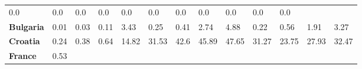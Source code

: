 \begin{table}[H]
{\begin{tabular}{lllllllllllll}
            0.0                                                &
            0.0                                                &
            0.0                                                &
            0.0                                                &
            0.0                                                &
            0.0                                                &
            0.0                                                &
            0.0                                                &
            0.0                                                &
            0.0                                                &
            0.0                                                  \\
            \textbf{Bulgaria}                                  &
            0.01                                               &
            0.03                                               &
            0.11                                               &
            3.43                                               &
            0.25                                               &
            0.41                                               &
            2.74                                               &
            4.88                                               &
            0.22                                               &
            0.56                                               &
            1.91                                               &
            3.27                                                 \\
            \textbf{Croatia}                                   &
            0.24                                               &
            0.38                                               &
            0.64                                               &
            14.82                                              &
            31.53                                              &
            42.6                                               &
            45.89                                              &
            47.65                                              &
            31.27                                              &
            23.75                                              &
            27.93                                              &
            32.47                                                \\
            \textbf{France}                                    &
            0.53                                               &

\end{tabular}}
\end{table}
